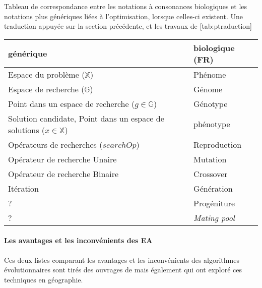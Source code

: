 \begin{table}[!htbp]
\begin{sidecaption}{Tableau de correspondance entre les notations à consonances biologiques et les notations plus génériques liées à l'optimisation, lorsque celles-ci existent. Une traduction appuyée sur la section précédente, et les travaux de \textcite{Weise2011}}
	[tab:ptraduction]
	\centering
	\begin{tabular}{ll}
		\toprule
		générique & biologique (FR)\\
		\midrule
		Espace du problème ($\mathbb{X}$) & Phénome \\
		Espace de recherche ($\mathbb{G}$)   &  Génome \\
		Point dans un espace de recherche ($g \in \mathbb{G}$) & Génotype \\
		Solution candidate, Point dans un espace de solutions ($x \in \mathbb{X}$) & phénotype \\
		Opérateurs de recherches ($searchOp$) & Reproduction \\
		Opérateur de recherche Unaire & Mutation \\
		Opérateur de recherche Binaire & Crossover \\
		Itération & Génération \\
		?  & Progéniture \\
		?  & \textit{Mating pool} \\
		\bottomrule
	\end{tabular}
  \end{sidecaption}
\end{table}

\paragraph{Les avantages et les inconvénients des EA}

Ces deux listes comparant les avantages et les inconvénients des algorithmes évolutionnaires sont tirés des ouvrages de \textcites{Deb2001, Fogel2000, Back1997}[104,105]{DeJong2006a} mais également \textcites{Diplock1996,Openshaw1988} qui ont exploré ces techniques en géographie.

